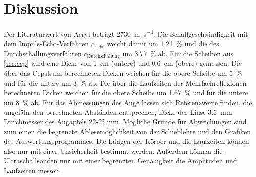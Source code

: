 \section{Diskussion}
\label{sec:Diskussion}

Der Literaturwert von Acryl beträgt \SI{2730}{\meter\per\second}. \cite{Acryl}
Die Schallgeschwindigkeit mit dem Impuls-Echo-Verfahren $c_\text{Echo}$ weicht damit um \SI{1.21}{\percent} und die des Durchschallungsverfahren $c_\text{Durchschallung}$ um \SI{3.77}{\percent} ab.
Für die Scheiben aus \ref{sec:cep} wird eine Dicke von \SI{1}{\centi\meter} (untere) und \SI{0.6}{\centi\meter} (obere) gemessen.
Die über das Cepstrum berechneten Dicken weichen für die obere Scheibe um \SI{5}{\percent} und für die untere um \SI{3}{\percent} ab.
Die über die Laufzeiten der Mehrfachreflexionen berechneten Dicken weichen für die obere Scheibe um \SI{1.67}{\percent} und für die untere um \SI{8}{\percent} ab.
Für das Abmessungen des Auge lassen sich Referenzwerte finden, die ungefähr den berechneten Abständen entsprechen,
Dicke der Linse \SI{3.5}{\milli\meter}, Durchmesser des Augapfels 22-23 mm. \cite{Auge}
Mögliche Gründe für Abweichungen sind zum einen die begrenzte Ablesemöglichkeit von der Schieblehre und den Grafiken des Auswertungsprogrammes.
Die Längen der Körper und die Laufzeiten können also nur mit einer Unsicherheit bestimmt werden.
Außerdem können die Ultraschallsonden nur mit einer begrenzten Genauigkeit die Amplituden und Laufzeiten messen.
